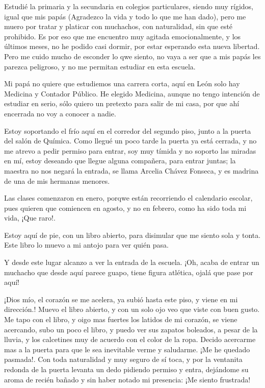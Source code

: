 \documentclass[letterpaper, 12pt]{book}
\begin{document}
Estudié la primaria y la secundaria en colegios particulares, siendo muy rígidos, igual que mis papás (Agradezco la vida y todo lo que me han dado), pero me muero por tratar y platicar con muchachos, con naturalidad, sin que esté prohibido. Es por eso que me encuentro muy agitada emocionalmente, y los últimos meses, no he podido casi dormir, por estar esperando esta nueva libertad. Pero me cuido mucho de esconder lo qwe siento, no vaya a ser que a mis papás les parezca peligroso, y no me permitan estudiar en esta escuela.

Mi papá no quiere que estudiemos una carrera corta, aquí en León solo hay Medicina y Contador Público. He elegido Medicina, aunque no tengo intención de estudiar en serio, sólo quiero un pretexto para salir de mi casa, por que ahí encerrada no voy a conocer a nadie.

Estoy soportando el frío aquí en el corredor del segundo piso, junto a la puerta del salón de Química. Como llegué un poco tarde la puerta ya está cerrada, y no me atrevo a pedir permiso para entrar, soy muy tímida y no soporto las miradas en mí, estoy deseando que llegue alguna compañera, para entrar juntas; la maestra no nos negará la entrada, se llama Arcelia Chávez Fonseca, y es madrina de una de mis hermanas menores.

Las clases comenzaron en enero, porqwe están recorriendo el calendario escolar, pues quieren que comiencen en agosto, y no en febrero, como ha sido toda mi vida, ¡Que raro!.

Estoy aquí de pie, con un libro abierto, para disimular que me siento sola y tonta. Este libro lo muevo a mi antojo para ver quién pasa.
 
Y desde este lugar alcanzo a ver la entrada de la escuela. ¡Oh, acaba de entrar un muchacho que desde aquí parece guapo, tiene figura atlética, ojalá que pase por aquí!

¡Dios mío, el corazón se me acelera, ya subió hasta este piso, y viene en mi dirección.! Muevo el libro abierto, y con un solo ojo veo que viste con buen gusto. Me tapo con el libro, y oigo mas fuertes los latidos de mi corazón, se viene acercando, subo un poco el libro, y puedo ver sus zapatos boleados, a pesar de la lluvia, y los calcetines muy de acuerdo con el color de la ropa. Decido acercarme mas a la puerta para que le sea inevitable verme y saludarme. ¡Me he quedado pasmada!. Con toda naturalidad y muy seguro de sí toca, y por la ventanita redonda de la puerta levanta un dedo pidiendo permiso y entra, dejándome su aroma de recién bañado y sin haber notado mi presencia: ¡Me siento frustrada!
\end{document}
